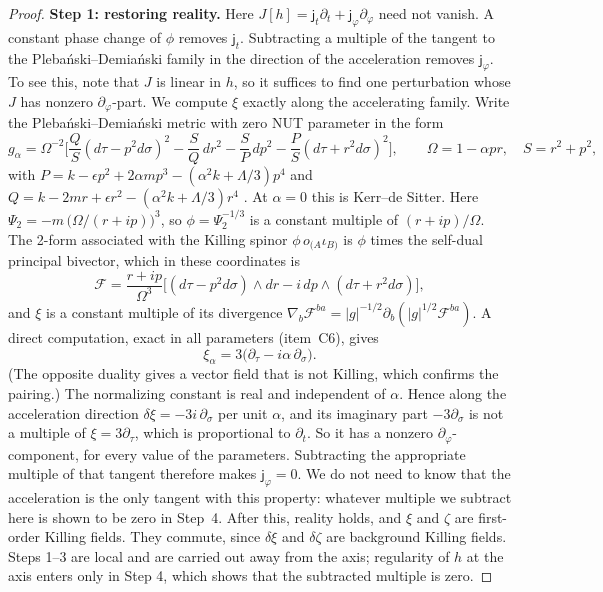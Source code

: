 \documentclass[11pt]{amsart}
\theoremstyle{definition}
\theoremstyle{remark}
\numberwithin{equation}{section}
\begin{document}
\begin{proof}
\textbf{Step 1: restoring reality.} Here $J[h]=\mathsf j_t\partial_t+\mathsf j_\varphi\partial_\varphi$ need not vanish. A constant phase change of
$\phi$ removes $\mathsf j_t$. Subtracting a multiple of the tangent to the Pleba\'nski--Demia\'nski family in the direction of
the acceleration removes $\mathsf j_\varphi$. To see this, note that $J$ is linear in $h$, so it suffices to find one
perturbation whose $J$ has nonzero $\partial_\varphi$-part. We compute $\xi$ exactly along the accelerating family.
Write the Pleba\'nski--Demia\'nski metric with zero NUT parameter in the form
\[
g_\alpha=\Omega^{-2}\Big[\frac{Q}{S}(d\tau-p^2d\sigma)^2-\frac SQ\,dr^2-\frac SP\,dp^2-\frac PS(d\tau+r^2d\sigma)^2\Big],
\qquad \Omega=1-\alpha pr,\quad S=r^2+p^2,
\]
with $P=k-\epsilon p^2+2\alpha mp^3-(\alpha^2k+\Lambda/3)p^4$ and $Q=k-2mr+\epsilon r^2-(\alpha^2k+\Lambda/3)r^4$ \cite{GP06}. At
$\alpha=0$ this is Kerr--de Sitter. Here $\Psi_2=-m\,\big(\Omega/(r+ip)\big)^3$, so $\phi=\Psi_2^{-1/3}$ is a constant multiple
of $(r+ip)/\Omega$. The 2-form associated with the Killing spinor $\phi\,o_{(A}\iota_{B)}$ is $\phi$ times the self-dual
principal bivector, which in these coordinates is
\[
\mathcal F=\frac{r+ip}{\Omega^{3}}\Big[(d\tau-p^2d\sigma)\wedge dr-i\,dp\wedge(d\tau+r^2d\sigma)\Big],
\]
and $\xi$ is a constant multiple of its divergence $\nabla_b\mathcal F^{ba}=|g|^{-1/2}\partial_b(|g|^{1/2}\mathcal F^{ba})$. A
direct computation, exact in all parameters (item~C6), gives
\[
\xi_\alpha=3\big(\partial_\tau-i\alpha\,\partial_\sigma\big).
\]
(The opposite duality gives a vector field that is not Killing, which confirms the pairing.) The normalizing constant
is real and independent of $\alpha$. Hence along the acceleration direction $\delta\xi=-3i\,\partial_\sigma$ per unit
$\alpha$, and its imaginary part $-3\partial_\sigma$ is not a multiple of $\xi=3\partial_\tau$, which is proportional to
$\partial_t$. So it has a nonzero $\partial_\varphi$-component, for every value of the parameters. Subtracting the appropriate multiple of that tangent therefore makes
$\mathsf j_\varphi=0$. We do not need to know that the acceleration is the only tangent with this property: whatever
multiple we subtract here is shown to be zero in Step~4. After this, reality holds, and $\xi$ and
$\zeta$ are first-order Killing fields. They commute, since $\delta\xi$ and $\delta\zeta$ are background Killing
fields. Steps 1--3 are local and are carried out away from the axis; regularity of $h$ at the axis enters only in
Step 4, which shows that the subtracted multiple is zero.


\end{proof}
\end{document}
